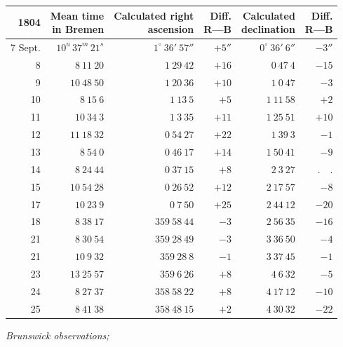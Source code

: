 \begin{center}
\begingroup\fontsize{8}{10}\selectfont\setlength{\tabcolsep}{3pt}\renewcommand{\arraystretch}{1.12}
\begin{tabular}{r|r|r|r|r|r}
1804 & \shortstack{Mean time\\in Bremen} & \shortstack{Calculated right\\ascension} & \shortstack{Diff.\\R—B} & \shortstack{Calculated\\declination} & \shortstack{Diff.\\R—B} \\ \hline
7 Sept. & $10^{u}\,37^{m}\,21^{s}$ & $1^\circ\ 36'\ 57''$ & $+5''$ & $0^\circ\ 36'\ 6''$ & $-3''$ \\
8 & $8\ 11\ 20$ & $1\ 29\ 42$ & $+16$ & $0\ 47\ 4$ & $-15$ \\
9 & $10\ 48\ 50$ & $1\ 20\ 36$ & $+10$ & $1\ 0\ 47$ & $-3$ \\
10 & $8\ 15\ 6$ & $1\ 13\ 5$ & $+5$ & $1\ 11\ 58$ & $+2$ \\
11 & $10\ 34\ 3$ & $1\ 3\ 35$ & $+11$ & $1\ 25\ 51$ & $+10$ \\
12 & $11\ 18\ 32$ & $0\ 54\ 27$ & $+22$ & $1\ 39\ 3$ & $-1$ \\
13 & $8\ 54\ 0$ & $0\ 46\ 17$ & $+14$ & $1\ 50\ 41$ & $-9$ \\
14 & $8\ 24\ 44$ & $0\ 37\ 15$ & $+8$ & $2\ 3\ 27$ & $ .\quad . $ \\
15 & $10\ 54\ 28$ & $0\ 26\ 52$ & $+12$ & $2\ 17\ 57$ & $-8$ \\
17 & $10\ 23\ 9$ & $0\ 7\ 50$ & $+25$ & $2\ 44\ 12$ & $-20$ \\
18 & $8\ 38\ 17$ & $359\ 58\ 44$ & $-3$ & $2\ 56\ 35$ & $-16$ \\
21 & $8\ 30\ 54$ & $359\ 28\ 49$ & $-3$ & $3\ 36\ 50$ & $-4$ \\
21 & $10\ 9\ 32$ & $359\ 28\ 8$ & $-1$ & $3\ 37\ 45$ & $-1$ \\
23 & $13\ 25\ 57$ & $359\ 6\ 26$ & $+8$ & $4\ 6\ 32$ & $-5$ \\
24 & $8\ 27\ 37$ & $358\ 58\ 22$ & $+8$ & $4\ 17\ 12$ & $-10$ \\
25 & $8\ 41\ 38$ & $358\ 48\ 15$ & $+2$ & $4\ 30\ 32$ & $-22$ \\
\end{tabular}\endgroup
\end{center}

\begin{center}
\textit{Brunswick observations;} 
\end{center}

